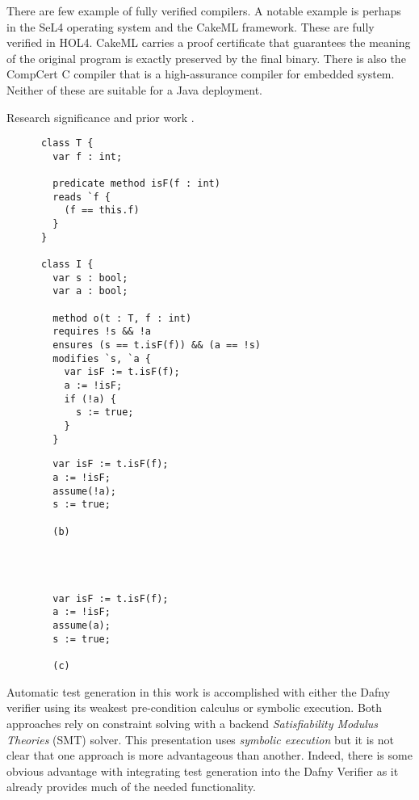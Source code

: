 \documentclass[11pt,onecolumn,notitlepage]{article}
\begin{document}
There are few example of fully verified compilers. A notable example is perhaps in the SeL4 operating system and the CakeML framework. These are fully verified in HOL4. CakeML carries a proof certificate that guarantees the meaning of the original program is exactly preserved by the final binary. There is also the CompCert C compiler that is a high-assurance compiler for embedded system. Neither of these are suitable for a Java deployment.

Research significance and prior work \cite{8972014}.

\newsavebox{\boxa}
\begin{lrbox}{\boxa}
    \begin{lstlisting}
      class T {
        var f : int;

        predicate method isF(f : int)
        reads `f {
          (f == this.f)
        }
      }
      
      class I {
        var s : bool;
        var a : bool;

        method o(t : T, f : int)
        requires !s && !a
        ensures (s == t.isF(f)) && (a == !s) 
        modifies `s, `a {
          var isF := t.isF(f);
          a := !isF;
          if (!a) {
            s := true;
          }
        }
    \end{lstlisting}
\end{lrbox}

\newsavebox{\boxb}
\begin{lrbox}{\boxb}
    \begin{lstlisting}
        var isF := t.isF(f);
        a := !isF;
        assume(!a);
        s := true;

        (b)




        var isF := t.isF(f);
        a := !isF;
        assume(a);
        s := true;

        (c)
    \end{lstlisting}
\end{lrbox}

Automatic test generation in this work is accomplished with either the Dafny verifier using its weakest pre-condition calculus or symbolic execution. Both approaches rely on constraint solving with a backend \emph{Satisfiability Modulus Theories} (SMT) solver. This presentation uses \emph{symbolic execution} but it is not clear that one approach is more advantageous than another. Indeed, there is some obvious advantage with integrating test generation into the Dafny Verifier as it already provides much of the needed functionality.
\end{document}
